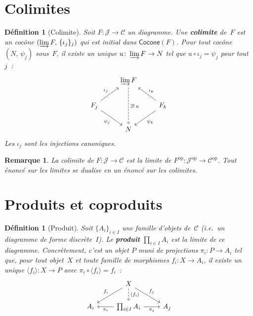 \documentclass[a4paper,12pt]{book}
\newcommand{\op}{\mathrm{op}}
\newtheorem{definition}[theoreme]{Définition}
\newtheorem*{remarque}{Remarque}
\begin{document}
\section{Colimites}\label{sec:colimites}

\begin{definition}[Colimite]\label{def:colimite}
Soit $F\colon\mathcal{J}\to\mathcal{C}$ un diagramme.
Une \textbf{colimite} de~$F$ est un cocône $(\varinjlim F,\,\{\iota_j\}_{j})$
qui est \emph{initial} dans $\mathsf{Cocone}(F)$.
Pour tout cocône $(N,\,\psi_j)$ sous~$F$, il existe un unique
$u\colon \varinjlim F\to N$ tel que $u\circ\iota_j = \psi_j$
pour tout $j$~:
\[
\begin{tikzcd}
& \varinjlim F \arrow[dd, dashed, "\exists!\, u"] & \\
F_j \arrow[ur, "\iota_j"] \arrow[dr, "\psi_j"'] & & F_k \arrow[ul, "\iota_k"'] \arrow[dl, "\psi_k"] \\
& N &
\end{tikzcd}
\]
Les $\iota_j$ sont les \emph{injections canoniques}.
\end{definition}

\begin{remarque}\label{rem:colimite-dualite}
La colimite de $F\colon\mathcal{J}\to\mathcal{C}$ est la limite de
$F^{\op}\colon\mathcal{J}^{\op}\to\mathcal{C}^{\op}$.
Tout énoncé sur les limites se dualise en un énoncé sur les colimites.
\end{remarque}


\section{Produits et coproduits}\label{sec:produits-coproduits}

\begin{definition}[Produit]\label{def:produit}
Soit $\{A_i\}_{i\in I}$ une famille d'objets de~$\mathcal{C}$
(i.e.\ un diagramme de forme discrète~$I$).
Le \textbf{produit} $\prod_{i\in I}A_i$ est la limite de ce diagramme.
Concrètement, c'est un objet $P$ muni de projections
$\pi_i\colon P\to A_i$ tel que, pour tout objet~$X$ et toute famille
de morphismes $f_i\colon X\to A_i$, il existe un unique
$\langle f_i\rangle\colon X\to P$ avec $\pi_i\circ\langle f_i\rangle = f_i$~:
\[
\begin{tikzcd}
& X \arrow[dl, "f_i"'] \arrow[d, dashed, "{\langle f_i\rangle}"] \arrow[dr, "f_j"] & \\
A_i & \prod_{i\in I}A_i \arrow[l, "\pi_i"] \arrow[r, "\pi_j"'] & A_j
\end{tikzcd}
\]
\end{definition}
\end{document}

